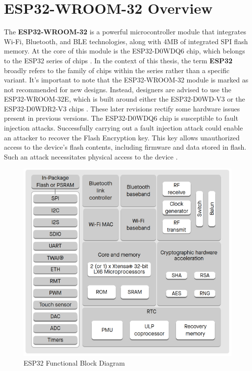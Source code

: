 \section{ESP32-WROOM-32 Overview}
The \textbf{ESP32-WROOM-32} is a powerful microcontroller module that integrates Wi-Fi, Bluetooth, and \ac{BLE} technologies, along with 4MB of integrated SPI flash memory. At the core of this module is the ESP32-D0WDQ6 chip, which belongs to the ESP32 series of chips  \cite[6]{esp32-module}. In the context of this thesis, the term \textbf{ESP32} broadly refers to the family of chips within the series rather than a specific variant. It's important to note that the ESP32-WROOM-32 module is marked as not recommended for new designs. Instead, designers are advised to use the ESP32-WROOM-32E, which is built around either the ESP32-D0WD-V3 or the ESP32-D0WDR2-V3 chips \cite[1]{esp32-module-new}. These later revisions rectify some hardware issues \cite[3-4]{esp32-errata} present in previous versions. The ESP32-D0WDQ6 chip is susceptible to fault injection attacks. Successfully carrying out a fault injection attack could enable an attacker to recover the Flash Encryption key. This key allows unauthorized access to the device's flash contents, including firmware and data stored in flash. Such an attack necessitates physical access to the device \cite{chip-revision}. 
\begin{figure}[ht!]
	\centering
	\includegraphics[scale=.5]{abbildungen/functional-block-diagram}
	\caption{ESP32 Functional Block Diagram} \label{Fig:esp32-crypto}
\end{figure}
